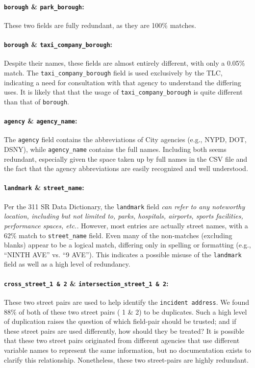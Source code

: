 \documentclass[linenumber]{jdsart}
\begin{document}
\paragraph{\texttt{borough} \& \texttt{park\_borough}:} These two fields are fully redundant, 
as they are 100\% matches.

\paragraph{\texttt{borough} \& \texttt{taxi\_company\_borough}:} Despite 
their names, these fields are almost entirely different, with only 
a 0.05\% match. The \texttt{taxi\_company\_borough} field is 
used exclusively by the TLC, indicating a need for consultation 
with that agency to understand the differing uses. It is 
likely that that the usage of \texttt{taxi\_company\_borough} is 
quite different than that of \texttt{borough}. 

\paragraph{\texttt{agency} \& \texttt{agency\_name}:} The \texttt{agency} 
field contains the abbreviations of City agencies (e.g., NYPD, DOT, DSNY), 
while \texttt{agency\_name} contains the full names. Including both seems 
redundant, especially given the space taken up by full names in the 
CSV file and the fact that the agency abbreviations are 
easily recognized and well understood.

\paragraph{\texttt{landmark} \& \texttt{street\_name}:} Per the 
311 SR Data Dictionary, the \texttt{landmark} 
field \textit{can refer to any noteworthy location, 
including but not limited to, parks, hospitals, airports, sports facilities, 
performance spaces, etc..} However, most entries are actually 
street names, with a 62\% match to \texttt{street\_name} field. 
Even many of the non-matches (excluding blanks) appear to be 
a logical match, differing only in spelling or formatting 
(e.g., ``NINTH AVE'' vs. ``9 AVE''). This indicates a possible 
misuse of the \texttt{landmark} field as well as a high level of redundancy.

\paragraph{\texttt{cross\_street\_1 \& 2} \& \texttt{intersection\_street\_1 \& 2}:} These 
two street pairs are used to help identify the 
\texttt{incident address}. We found 88\% of both of these two 
street pairs ( 1 \& 2) to be duplicates. Such a high level of duplication 
raises the question of which field-pair should be trusted; 
and if these street pairs are used differently, how should they be treated?
It is possible that these two street pairs originated from different 
agencies that use different variable names to represent the same 
information, but no documentation exists to clarify this 
relationship. Nonetheless, these two street-pairs are highly redundant.
\end{document}
